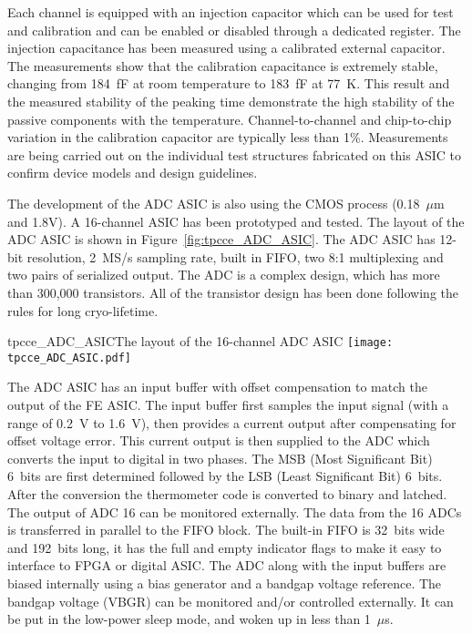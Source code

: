 Each channel is equipped with an injection capacitor which can be used
for test and calibration and can be enabled or disabled through a
dedicated register. The injection capacitance has been measured using 
a calibrated external capacitor. The measurements show
that the calibration capacitance is extremely stable, changing from
184~fF at room temperature to 183~fF at 77~K. This result and the measured
stability of the peaking time demonstrate the high stability of the
passive components with the temperature. Channel-to-channel and chip-to-chip
variation in the calibration capacitor are typically less than 1\%. Measurements are being carried
out on the individual test structures fabricated on this ASIC to
confirm device models and design guidelines.

The development of the ADC ASIC is also using the CMOS process (0.18~$\mu$m and 1.8V).
A 16-channel ASIC has been prototyped and tested.
The layout of the ADC ASIC is shown in Figure~\ref{fig:tpcce_ADC_ASIC}. 
The ADC ASIC has 12-bit resolution, 2~MS/s sampling rate, built in FIFO, two 8:1 multiplexing and two pairs of serialized output.
The ADC is a complex design, which has more than 300,000 transistors.
All of the transistor design has been done following the rules for long cryo-lifetime.

\begin{cdrfigure}{tpcce_ADC_ASIC}{The layout of the 16-channel ADC ASIC}
\texttt{[image: tpcce\_ADC\_ASIC.pdf]} %
\end{cdrfigure}

The ADC ASIC has an input buffer with offset compensation to match the output of the FE ASIC.
The input buffer first samples the input signal (with a range of 0.2~V to 1.6~V),
then provides a current output after compensating for offset voltage error.
This current output is then supplied to the ADC which converts the input to digital in two phases.
The MSB (Most Significant Bit) 6~bits are first determined followed by the LSB (Least Significant Bit) 6~bits.
After the conversion the thermometer code is converted to binary and latched.
The output of ADC 16 can be monitored externally.
The data from the 16 ADCs is transferred in parallel to the FIFO block.
The built-in FIFO is 32~bits wide and 192~bits long,
it has the full and empty indicator flags to make it easy to interface to FPGA or digital ASIC.
The ADC along with the input buffers are biased internally using a bias generator and a bandgap voltage reference.
The bandgap voltage (VBGR) can be monitored and/or controlled externally.
It can be put in the low-power sleep mode, and woken up in less than 1~$\mu$s.

